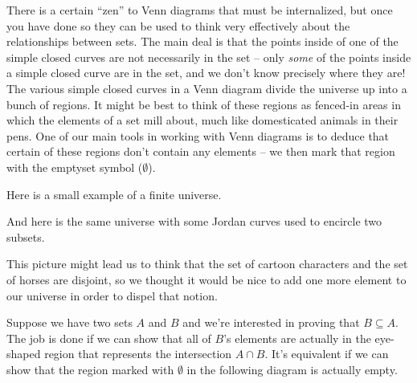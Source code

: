 There is a certain ``zen'' to Venn diagrams that must be internalized,
but once you have done so they can be used to think very effectively
about the relationships between sets.  The main deal is that the points
inside of one of the simple closed curves are not necessarily in the set --
only \emph{some} of the points inside a simple closed curve are in the
set, and we don't know precisely where they are!  The various simple closed 
curves in a Venn diagram divide the universe up into a bunch of regions.
It might be best to think of these regions as fenced-in areas in which
the elements of a set mill about, much like domesticated animals 
in their pens.
One of our main tools in working with Venn diagrams is to deduce that
certain of these regions don't contain any elements -- we then mark that
region with the emptyset symbol ($\emptyset$). 

Here is a small example of a finite universe.

\vspace{.1in}



\vspace{.1in}

\noindent And here is the same universe with some Jordan curves 
used to encircle two subsets.

\vspace{.1in}



\vspace{.1in}

This picture might lead us to think that the set of cartoon characters
and the set of horses are disjoint, so we thought it would be nice
to add one more element to our universe in order to dispel that notion.

\vspace{.1in}



\vspace{.1in}


Suppose we have two sets $A$ and $B$ and we're interested
in proving that $B \subseteq A$.  The job is done if we can show that
all of $B$'s elements are actually in the eye-shaped region that represents
the intersection $A \cap B$.  It's equivalent if we can show that the
region marked with $\emptyset$ in the following diagram is actually empty.

\vspace{.1in}

